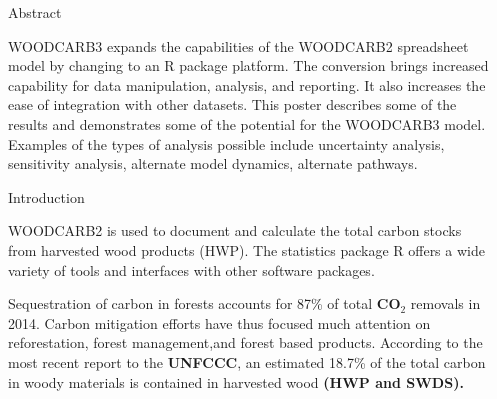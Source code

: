 \documentclass[final]{beamer}\usepackage[]{graphicx}\usepackage[]{color}
\newlength{\sepwid}
\newlength{\onecolwid}
\begin{document}
\begin{frame}[t]
\begin{columns}[t]
\begin{column}{\sepwid}\end{column} %

\begin{column}{\onecolwid} %



\begin{alertblock}{Abstract}

WOODCARB3 expands the capabilities of the WOODCARB2 spreadsheet model by changing to an R package platform. The conversion brings increased capability for data manipulation, analysis, and reporting. It also increases the ease of integration with other datasets. This poster describes some of the results and demonstrates some of the potential for the WOODCARB3 model. Examples of the types of analysis possible include uncertainty analysis, sensitivity analysis, alternate model dynamics, alternate pathways.

\vspace{0ex}

\end{alertblock}
\begin{block}{Introduction}


WOODCARB2 is used to document and calculate the total carbon stocks from harvested wood products (HWP). The statistics package R offers a wide variety of tools and interfaces with other software packages.
\vspace{1ex}

Sequestration of carbon in forests accounts for 87\% of total \textbf{CO$_{2}$} removals in 2014. Carbon mitigation efforts have thus focused much attention on reforestation, forest management,and forest based products. According to the most recent report to the \textbf{UNFCCC}, an estimated 18.7\% of the total carbon in woody materials is contained in harvested wood \textbf{(HWP and SWDS).}
\vspace{1ex}  


\end{block}
\end{column}
\end{columns}
\end{frame}
\end{document}
